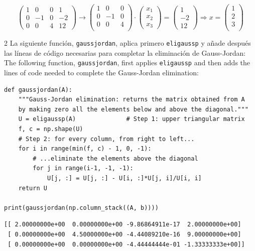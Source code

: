 \begin{equation*}
\begin{pmatrix}
1&     0&     0&    1\\
 0&    -1&    0&    -2\\
 0&     0&     4&    12
\end{pmatrix} \rightarrow \begin{pmatrix}
1&     0&     0\\
 0&    -1&    0\\
 0&     0&     4\\
\end{pmatrix}\cdot\begin{pmatrix}
x_1\\
x_2\\
x_3
\end{pmatrix}=\begin{pmatrix}
1\\
-2\\
12
\end{pmatrix} \Rightarrow x=\begin{pmatrix}
1\\
2\\
3\\
\end{pmatrix}
\end{equation*}

\begin{paracol}{2}
La siguiente función, \texttt{gaussjordan}, aplica primero \texttt{eligaussp} y añade después las líneas de código necesarias para completar la eliminación de Gauss-Jordan:
\switchcolumn
The following function, \texttt{gaussjordan}, first applies \texttt{eligaussp} and then adds the lines of code needed to complete the Gauss-Jordan elimination:
\end{paracol}

\begin{verbatim}
def gaussjordan(A):
    """Gauss-Jordan elimination: returns the matrix obtained from A
    by making zero all the elements below and above the diagonal."""
    U = eligaussp(A)              # Step 1: upper triangular matrix
    f, c = np.shape(U)
    # Step 2: for every column, from right to left...
    for i in range(min(f, c) - 1, 0, -1):
        # ...eliminate the elements above the diagonal
        for j in range(i-1, -1, -1):
            U[j, :] = U[j, :] - U[i, :]*U[j, i]/U[i, i]
    return U

print(gaussjordan(np.column_stack((A, b))))
\end{verbatim}
\begin{verbatim}
[[ 2.00000000e+00  0.00000000e+00 -9.86864911e-17  2.00000000e+00]
 [ 0.00000000e+00  4.50000000e+00 -4.44089210e-16  9.00000000e+00]
 [ 0.00000000e+00  0.00000000e+00 -4.44444444e-01 -1.33333333e+00]]
\end{verbatim}

